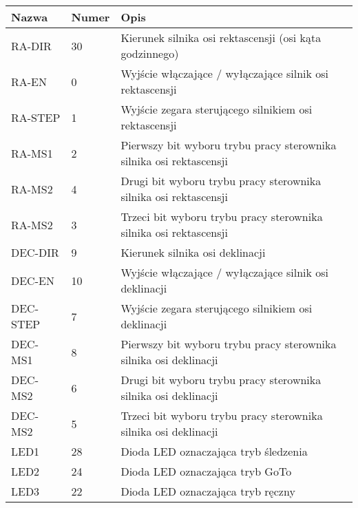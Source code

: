 \begin{table}[h]

\begin{tabularx}{\linewidth}{|l|l|X|}

\hline Nazwa & Numer & Opis \\

	\hline RA-DIR & 30 & Kierunek silnika osi rektascensji (osi kąta
	godzinnego) \\

	\hline RA-EN & 0 & Wyjście włączające / wyłączające silnik osi
	rektascensji \\

	\hline RA-STEP & 1 & Wyjście zegara sterującego silnikiem osi
	rektascensji \\
	
	\hline RA-MS1 & 2 & Pierwszy bit wyboru trybu pracy sterownika silnika
	osi rektascensji \\
	
	\hline RA-MS2 & 4 & Drugi bit wyboru trybu pracy sterownika silnika osi
	rektascensji \\
	
	\hline RA-MS2 & 3 & Trzeci bit wyboru trybu pracy sterownika silnika osi
	rektascensji \\
	
	\hline DEC-DIR & 9 & Kierunek silnika osi deklinacji \\

	\hline DEC-EN & 10 & Wyjście włączające / wyłączające silnik osi
	deklinacji \\

	\hline DEC-STEP & 7 & Wyjście zegara sterującego silnikiem osi
	deklinacji \\
	
	\hline DEC-MS1 & 8 & Pierwszy bit wyboru trybu pracy sterownika silnika
	osi deklinacji \\
	
	\hline DEC-MS2 & 6 & Drugi bit wyboru trybu pracy sterownika silnika osi
	 deklinacji\\
	
	\hline DEC-MS2 & 5 & Trzeci bit wyboru trybu pracy sterownika silnika
	osi deklinacji \\
	
	\hline LED1 & 28 & Dioda LED oznaczająca tryb śledzenia\\
	
	\hline LED2 & 24 & Dioda LED oznaczająca tryb GoTo \\

	\hline LED3 & 22 & Dioda LED oznaczająca tryb ręczny \\
	

\end{tabularx}
\end{table}
